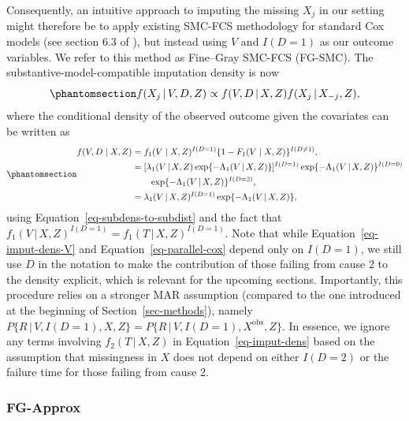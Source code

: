 \documentclass[
  letterpaper,
  DIV=11,
  numbers=noendperiod]{scrreprt}
\newcommand{\given}{\,|\,}
\begin{document}
Consequently, an intuitive approach to imputing the missing \(X_j\) in
our setting might therefore be to apply existing SMC-FCS methodology for
standard Cox models (see section 6.3 of
), but instead using \(V\) and \(I(D = 1)\) as our
outcome variables. We refer to this method as Fine--Gray SMC-FCS
(FG-SMC). The substantive-model-compatible imputation density is now
\begin{equation}\phantomsection\label{eq-imput-dens-V}{
f(X_j \given V, D, Z) \propto f(V, D \given X, Z)f(X_j \given X_{-j},Z),
}\end{equation} where the conditional density of the observed outcome
given the covariates can be written as
\begin{equation}\phantomsection\label{eq-parallel-cox}{
\begin{aligned}
    f(V, D \mid X, Z) &= f_1(V \mid X, Z)^{I(D = 1)}\{1 - F_1(V \mid X, Z)\}^{I(D \neq 1)},  \\
    &= [\lambda_1(V \given X, Z)\exp\{- \Lambda_1(V \given X, Z)\}]^{I(D = 1)}\exp\{- \Lambda_1(V \given X, Z)\}^{I(D = 0)}  \\
    &\qquad \exp\{- \Lambda_1(V \given X, Z)\}^{I(D = 2)},   \\
    &= \lambda_1(V \given X, Z)^{I(D = 1)}\exp\{- \Lambda_1(V \given X, Z)\}, 
\end{aligned}
}\end{equation} using Equation~\ref{eq-subdens-to-subdist} and the fact
that \(f_1(V \given X, Z)^{I(D = 1)} = f_1(T \given X, Z)^{I(D = 1)}\).
Note that while Equation~\ref{eq-imput-dens-V} and
Equation~\ref{eq-parallel-cox} depend only on \(I(D = 1)\), we still use
\(D\) in the notation to make the contribution of those failing from
cause 2 to the density explicit, which is relevant for the upcoming
sections. Importantly, this procedure relies on a stronger MAR
assumption (compared to the one introduced at the beginning of
Section~\ref{sec-methods}), namely
\(P\{R \given V, I(D = 1), X, Z\} = P\{R \given V, I(D = 1), X^{\text{obs}}, Z\}\).
In essence, we ignore any terms involving \(f_2(T \given X, Z)\) in
Equation~\ref{eq-imput-dens} based on the assumption that missingness in
\(X\) does not depend on either \(I(D = 2)\) or the failure time for
those failing from cause 2.

\subsubsection{FG-Approx}\label{sec-fg-approx}
\end{document}
